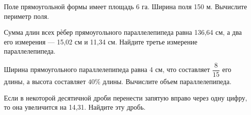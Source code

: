 \begin{class}[number=3]
\begin{listofex}
		\item Поле прямоугольной формы имеет площадь 6 га. Ширина поля 150 м.
		Вычислите периметр поля.
		\item Сумма длин всех рѐбер прямоугольного параллелепипеда равна 136,64 см, а два его измерения --- 15,02 см и 11,34 см. Найдите третье измерение параллелепипеда.
		\item Ширина прямоугольного параллелепипеда равна 4 см, что составляет  \( \dfrac{8}{15} \) его длины, а высота составляет \( 40\% \) длины. Вычислите объем параллелепипеда.
		\item Если в некоторой десятичной дроби перенести запятую вправо через одну цифру, то она увеличится на 14,31. Найдите эту дробь.
		
	\end{listofex}
\end{class}

